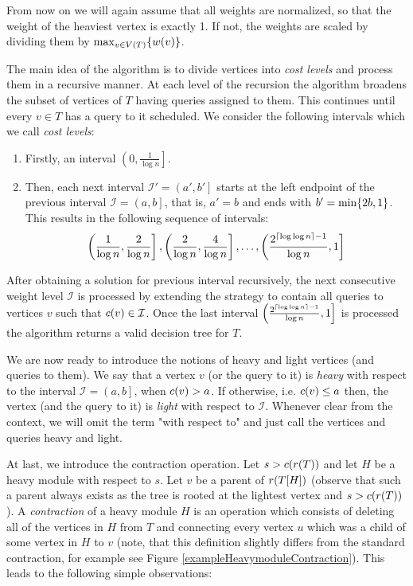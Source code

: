 From now on we will again assume that all weights are normalized, so that the weight of the heaviest vertex is exactly 1. If not, the weights are scaled by dividing them by $\max_{v\in V\mathopen{}\left( T \right)}\mathopen{}\left\{ w(v) \right\}$.

The main idea of the algorithm is to divide vertices into \textit{cost levels} and process them in a recursive manner. At each level of the recursion the algorithm broadens the subset of vertices of $T$ having queries assigned to them. This continues until every $v\in T$ has a query to it scheduled. We consider the following intervals which we call \textit{cost levels}:
\begin{enumerate}
    \item Firstly, an interval $\left( 0,\frac{1}{\log n}\right]$.
    \item Then, each next interval $\mathcal{I}'=\left(a',b'\right]$ starts at the left endpoint of the previous interval $\mathcal{I}=\left(a,b\right]$, that is, $a'=b$ and ends with $b'=\min\mathopen{}\left\{ 2b, 1 \right\}$. This results in the following sequence of intervals:
    $$\left(\frac{1}{\log n},\frac{2}{\log n}\right], \left(\frac{2}{\log n},\frac{4}{\log n}\right],\dots, \left(\frac{2^{\mathopen{}\left\lceil \log\log n \right\rceil-1}}{\log n},1\right]$$
\end{enumerate} 
After obtaining a solution for previous interval recursively, the next consecutive weight level $\mathcal{I}$ is processed by extending the strategy to contain all queries to vertices $v$ such that $c\mathopen{}\left( v \right)\in \mathcal{I}$.
Once the last interval $\left(\frac{2^{\mathopen{}\left\lceil \log\log n \right\rceil-1}}{\log n},1\right]$ is processed the algorithm returns a valid decision tree for $T$. 

We are now ready to introduce the notions of heavy and light vertices (and queries to them). We say that a vertex $v$ (or the query to it) is \textit{heavy} with respect to the interval $\mathcal{I}=\left(a,b\right]$, when $c\mathopen{}\left( v \right)>a$. If otherwise, i.e. $c\mathopen{}\left( v \right)\leq a$ then, the vertex (and the query to it) is \textit{light} with respect to $\mathcal{I}$. Whenever clear from the context, we will omit the term "with respect to" and just call the vertices and queries heavy and light.


At last, we introduce the contraction operation.
Let $s>c\mathopen{}\left( r\mathopen{}\left( T \right) \right)$ and let $H$ be a heavy module with respect to $s$. Let $v$ be a parent of $r\mathopen{}\left( T[H] \right)$ (observe that such a parent always exists as the tree is rooted at the lightest vertex and $s>c\mathopen{}\left( r\mathopen{}\left( T \right) \right)$).
A \textit{contraction} of a heavy module $H$ is an operation which consists of deleting all of the vertices in $H$ from $T$ and connecting every vertex $u$ which was a child of some vertex in $H$ to $v$ (note, that this definition slightly differs from the standard contraction, for example see Figure \ref{exampleHeavymoduleContraction}). This leads to the following simple observations:

